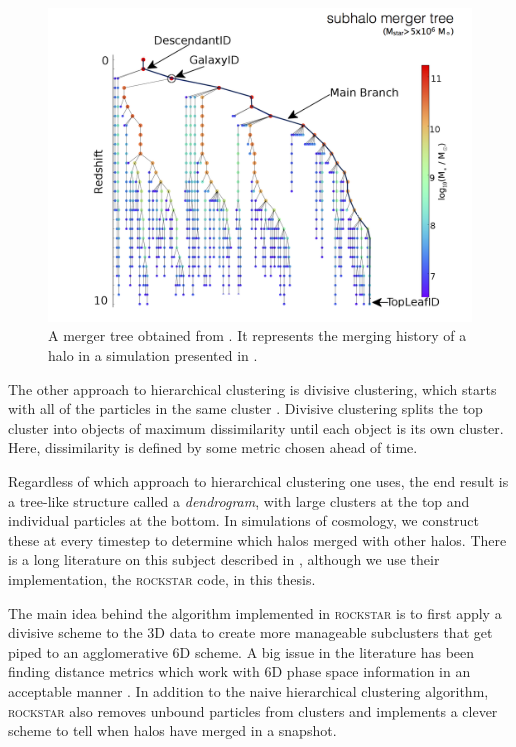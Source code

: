 \begin{figure}[h]
	\includegraphics[width=\textwidth]{../figures/eagle_tree}
	\caption{A merger tree obtained from \citet{merger_tree}. It represents the merging history of a halo in a simulation presented in \citet{Eagle}.} \label{fig:merger_tree}
\end{figure}

The other approach to hierarchical clustering is divisive clustering, which starts with all of the particles in the same cluster \citep{statistical_learning_r}. Divisive clustering splits the top cluster into objects of maximum dissimilarity until each object is its own cluster. Here, dissimilarity is defined by some metric chosen ahead of time. 

Regardless of which approach to hierarchical clustering one uses, the end result is a tree-like structure called a \textit{dendrogram}, with large clusters at the top and individual particles at the bottom. In simulations of cosmology, we construct these at every timestep to determine which halos merged with other halos. There is a long literature on this subject described in \citet{rockstar}, although we use their implementation, the \textsc{rockstar} code, in this thesis.

The main idea behind the algorithm implemented in \textsc{rockstar} is to first apply a divisive scheme to the 3D data to create more manageable subclusters that get piped to an agglomerative 6D scheme. A big issue in the literature has been finding distance metrics which work with 6D phase space information in an acceptable manner \citep{rockstar}. In addition to the naive hierarchical clustering algorithm, \textsc{rockstar} also removes unbound particles from clusters and implements a clever scheme to tell when halos have merged in a snapshot. 

